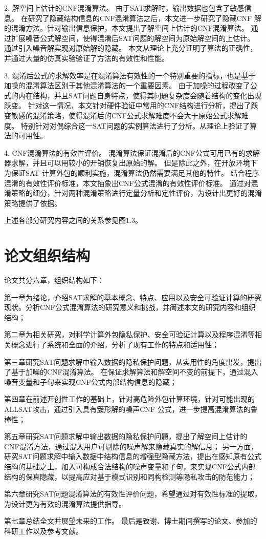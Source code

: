 2. 解空间上估计的CNF混淆算法。
由于SAT求解时，输出数据也包含了敏感信息。
在研究了隐藏结构信息的CNF混淆算法之后，本文进一步研究了隐藏CNF 解的混淆方法。针对输出信息保护，本文提出了解空间上估计的CNF混淆算法。
通过扩展噪音公式解空间，使得混淆后SAT问题的解空间为原始解空间的上估计。
通过引入噪音解实现对原始解的隐藏。
本文从理论上充分证明了算法的正确性，并通过大量的仿真实验验证了方法的有效性和性能。

3. 混淆后公式的求解效率是在混淆算法有效性的一个特别重要的指标，也是基于加噪的混淆算法区别于其他混淆算法的一个重要因素。
由于加噪的过程改变了公式的内在结构，并且SAT问题自身特点，使得其问题复杂度会随着结构的变化出现跃变。
针对这一情况，本文针对硬件验证中常用的CNF结构进行分析，提出了跃变敏感的混淆策略，使得混淆后的CNF公式求解难度不会大于原始公式求解难度。
特别针对对偶综合这一SAT问题的实例算法进行了分析。从理论上验证了算法的可用性。

4. CNF混淆算法的有效性评价。
混淆算法保证混淆后的CNF公式可用已有的求解器求解，并且可以用较小的开销恢复出原始的解。
但是除此之外，在开放环境下为保证SAT 计算外包的顺利实施，混淆算法仍然需要满足其他的特性。
结合程序混淆的有效性评价标准，本文抽象出CNF公式混淆的有效性评价标准。
通过对混淆策略的细分，针对两种混淆策略进行定量分析和定性评价，为设计出更好的混淆策略提供了依据。

上述各部分研究内容之间的关系参见图1.3。
\section{论文组织结构}
论文共分六章，组织结构如下：

第一章为绪论，介绍SAT求解的基本概念、特点、应用以及安全可验证计算的研究现状。分析CNF公式混淆算法的研究意义和挑战，并简述本文的研究内容和组织结构；

第二章为相关研究，对科学计算外包隐私保护、安全可验证计算以及程序混淆等相关概念进行了系统和全面的介绍，分析了现有工作的特点和适用性；

第三章研究SAT问题求解中输入数据的隐私保护问题，从实用性的角度出发，提出了基于加噪的CNF混淆算法。
在保证求解算法和解空间不变的前提下，通过混入噪音变量和子句来实现CNF公式内部结构信息的隐藏；

第四章在前述开创性工作的基础上，针对高危险外包计算环境，针对可能出现的ALLSAT攻击，通过引入具有簇形解的噪声CNF 公式，进一步提高混淆算法的鲁棒性；

第五章研究SAT问题求解中输出数据的隐私保护问题，提出了解空间上估计的CNF混淆方法，通过混入用户可剔除的噪声解来隐藏真实的解信息；
另一方面，研究SAT问题求解中输入数据中结构信息的增强型隐藏方法，提出在感知原有公式结构的基础之上，加入可构成合法结构的噪声变量和子句，来实现CNF公式内部结构的保真隐藏，以提高应对基于模式识别和同构检测等隐私攻击的防范能力；

第六章研究SAT问题混淆算法的有效性评价问题，希望通过对有效性标准的提取，为设计更为有效的混淆算法提供指导。
%

第七章总结全文并展望未来的工作。
最后是致谢、博士期间撰写的论文、参加的科研工作以及参考文献。
